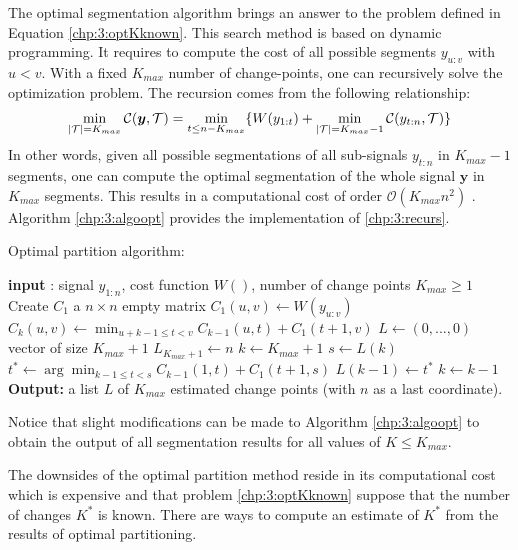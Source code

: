 The optimal segmentation algorithm brings an answer to the problem defined in Equation \eqref{chp:3:optKknown}. This search method is based on dynamic programming. It requires to compute the cost of all possible segments $y_{u:v}$ with $u<v$.  With a fixed $K_{max}$ number of change-points, one can recursively solve the optimization problem. The recursion comes from the following relationship: 
\begin{equation}\label{chp:3:recurs}
\min_{\lvert{\mathcal T}\rvert = K_{max}}\mathcal{C}(\bm y, {\mathcal T}) = \min_{t \leq n-K_{max}}\{W(y_{1:t})+\min_{\lvert{\mathcal T}\rvert = K_{max}-1}\mathcal{C}(y_{t:n},{\mathcal T})\} 
\end{equation}
In other words, given all possible segmentations of all sub-signals $y_{t:n}$ in $K_{max}-1$ segments, one can compute the optimal segmentation of the whole signal $\bm y$ in $K_{max}$ segments. This results in a computational cost of order $\mathcal{O}(K_{max}n^2)$ \citep{haynes2017}. Algorithm \ref{chp:3:algoopt} provides the implementation of \eqref{chp:3:recurs}. 

\begin{algorithm}[ht]
\caption{Optimal partition algorithm:}\label{chp:3:algoopt}
\begin{algorithmic}

\State \textbf{input} : signal $y_{1:n}$, cost function $W()$, number of change points $K_{max} \geq 1$
\State Create $C_1$ a $n\times n$ empty matrix
  \State $C_1(u,v) \gets W(y_{u:v})$
\EndFor
{}
      \State $C_k(u,v) \gets \min_{u+k-1 \leq t < v} C_{k-1}(u,t) + C_1(t+1,v)$ 
    \EndFor
  \EndFor
\EndIf
\State $L \gets (0,...,0)$ vector of size $K_{max}+1$
\State $L_{K_{max}+1} \gets n$
\State $k \gets K_{max}+1$
  \State $s \gets L(k)$
  \State $t^* \gets \arg\min_{k-1\leq t < s}C_{k-1}(1,t)+C_1(t+1,s)$
  \State $L(k-1) \gets t^*$
  \State $k \gets k-1$
\EndWhile
\State \textbf{Output:} a list $L$ of $K_{max}$ estimated change points (with $n$ as a last coordinate).
\end{algorithmic}
\end{algorithm} 

Notice that slight modifications can be made to Algorithm \ref{chp:3:algoopt} to obtain the output of all segmentation results for all values of $K\leq K_{max}$. 

The downsides of the optimal partition method reside in its computational cost which is expensive and that problem \eqref{chp:3:optKknown} suppose that the number of changes $K^*$ is known. There are ways to compute an estimate of $K^*$ from the results of optimal partitioning. 

